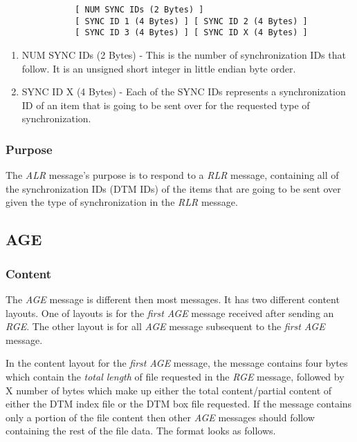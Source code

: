             \begin{verbatim}
              [ NUM SYNC IDs (2 Bytes) ]
              [ SYNC ID 1 (4 Bytes) ] [ SYNC ID 2 (4 Bytes) ]
              [ SYNC ID 3 (4 Bytes) ] [ SYNC ID X (4 Bytes) ]
            \end{verbatim}

            \begin{enumerate}
              \item NUM SYNC IDs (2 Bytes) - This is the number of
              synchronization IDs that follow. It is an unsigned short integer
              in little endian byte order.

              \item SYNC ID X (4 Bytes) - Each of the SYNC IDs represents a
                synchronization ID of an item that is going to be sent over
                for the requested type of synchronization.
            \end{enumerate}

            \subsubsection{Purpose}

            The \emph{ALR} message's purpose is to respond to a \emph{RLR}
            message, containing all of the synchronization IDs (DTM IDs) of
            the items that are going to be sent over given the type of
            synchronization in the \emph{RLR} message.

        \subsection{AGE}

            \subsubsection{Content}

            The \emph{AGE} message is different then most messages. It has two
            different content layouts. One of layouts is for the \emph{first}
            \emph{AGE} message received after sending an \emph{RGE}. The other
            layout is for all \emph{AGE} message subsequent to the
            \emph{first} \emph{AGE} message.

            In the content layout for the \emph{first} \emph{AGE} message, the
            message contains four bytes which contain the \emph{total length}
            of file requested in the \emph{RGE} message, followed by X number
            of bytes which make up either the total content/partial content of
            either the DTM index file or the DTM box file requested. If the
            message contains only a portion of the file content then other
            \emph{AGE} messages should follow containing the rest of the file
            data. The format looks as follows.

